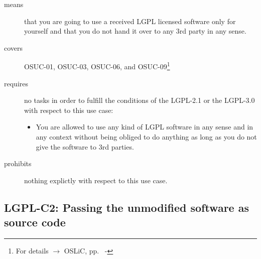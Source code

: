 \begin{description}

\item[means] that you are going to use a received LGPL licensed software only
for yourself and that you do not hand it over to any 3rd party in any sense.

\item[covers] OSUC-01, OSUC-03, OSUC-06, and OSUC-09\footnote{For details
$\rightarrow$ OSLiC, pp.\ \pageref{OSUC-01-DEF} - \pageref{OSUC-09-DEF}}

\item[requires] no tasks in order to fulfill the conditions of the LGPL-2.1 or
the LGPL-3.0 with respect to this use case:
  \begin{itemize}
    \item You are allowed to use any kind of LGPL software in any sense and in
    any context without being obliged to do anything as long as you do not
    give the software to 3rd parties.
  \end{itemize}

\item[prohibits] nothing explictly with respect to this use case.
\end{description}


\subsection{LGPL-C2: Passing the unmodified software as source code}
\label{OSUC-02S-LGPL} \label{OSUC-05S-LGPL} \label{OSUC-07S-LGPL} 

